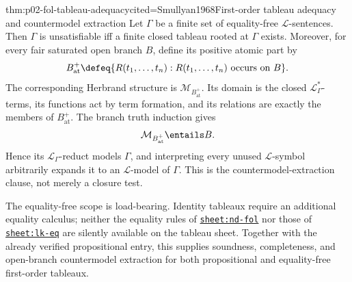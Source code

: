 \begin{hbtheorem}{thm:p02-fol-tableau-adequacy}{cited=Smullyan1968}{First-order tableau adequacy and countermodel extraction}
Let \(\Gamma\) be a finite set of equality-free \(\mathcal L\)-sentences.
Then \(\Gamma\) is unsatisfiable iff a finite closed tableau rooted at
\(\Gamma\) exists.  Moreover, for every fair saturated open branch \(B\),
define its positive atomic part by
\[
 B^{+}_{\mathrm{at}}
 \defeq
 \{R(t_1,\ldots,t_n):R(t_1,\ldots,t_n)\text{ occurs on }B\}.
\]
The corresponding Herbrand structure is
\(\mathcal M_{B^{+}_{\mathrm{at}}}\).  Its domain is the closed
\(\mathcal L_{\Gamma}^*\)-terms, its functions act by term formation, and
its relations are exactly the members of \(B^{+}_{\mathrm{at}}\).
The branch truth induction gives
\[
 \mathcal M_{B^{+}_{\mathrm{at}}}\entails B.
\]
Hence its
\(\mathcal L_{\Gamma}\)-reduct models \(\Gamma\), and interpreting every
unused \(\mathcal L\)-symbol arbitrarily expands it to an
\(\mathcal L\)-model of \(\Gamma\).
This is the countermodel-extraction clause, not merely a closure test.
\end{hbtheorem}

The equality-free scope is load-bearing.  Identity tableaux require an
additional equality calculus; neither the equality rules of
\hyperref[sheet:nd-fol]{\texttt{sheet:nd-fol}} nor those of
\hyperref[sheet:lk-eq]{\texttt{sheet:lk-eq}} are silently available
on the tableau sheet.  Together with the already verified propositional entry,
this supplies soundness, completeness, and open-branch countermodel extraction
for both propositional and equality-free first-order tableaux.

